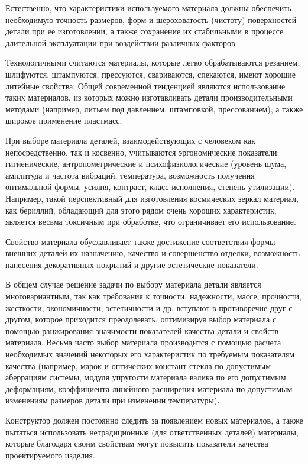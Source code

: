 Естественно, что характеристики используемого материала должны обеспечить необходимую точность размеров, форм и шероховатость (чистоту) поверхностей детали при ее изготовлении, а также сохранение их стабильными в процессе длительной эксплуатации при воздействии различных факторов.

Технологичными считаются материалы, которые легко обрабатываются резанием, шлифуются, штампуются, прессуются, свариваются, спекаются, имеют хорошие литейные свойства. Общей современной тенденцией являются использование таких материалов, из которых можно изготавливать детали производительными методами (например, литьем под давлением, штамповкой, прессованием), а также широкое применение пластмасс.

При выборе материала деталей, взаимодействующих с человеком как непосредственно, так и косвенно, учитываются эргономические показатели: гигиенические, антропометрические и психофизиологические (уровень шума, амплитуда и частота вибраций, температура, возможность получения оптимальной формы, усилия, контраст, класс исполнения, степень утилизации). Например, такой перспективный для изготовления космических зеркал материал, как бериллий, обладающий для этого рядом очень хороших характеристик, является весьма токсичным при обработке, что ограничивает его использование.

Свойство материала обуславливает также достижение соответствия формы внешних деталей их назначению, качество и совершенство отделки, возможность нанесения декоративных покрытий и другие эстетические показатели.

В общем случае решение задачи по выбору материала детали является многовариантным, так как требования к точности, надежности, массе, прочности, жесткости, экономичности, эстетичности и др. вступают в противоречие друг с другом, которое приходится преодолевать, оптимизируя выбор материала с помощью ранжирования значимости показателей качества детали и свойств материала. Весьма часто выбор материала производится с помощью расчета необходимых значений некоторых его характеристик по требуемым показателям качества (например, марок и оптических констант стекла по допустимым аберрациям системы, модуля упругости материала валика по его допустимым деформациям, коэффициента линейного расширения материала по допустимым изменениям размеров детали при изменении температуры).

Конструктор должен постоянно следить за появлением новых материалов, а также пытаться использовать нетрадиционные (для ответственных деталей) материалы, которые благодаря своим свойствам могут повысить показатели качества проектируемого изделия.

